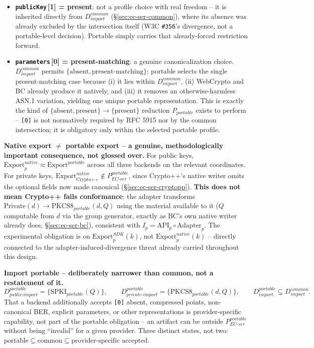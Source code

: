 \documentclass[11pt,a4paper]{article}
\begin{document}
\begin{itemize}
\item \textbf{\texttt{publicKey}\,[1] = present}: not a profile choice with real freedom -- it is inherited directly from $D_{import}^{common}$ (\S\ref{sec:ec-ser-common}), where its absence was already excluded by the intersection itself (W3C \texttt{\#356}'s divergence, not a portable-level decision). Portable simply carries that already-forced restriction forward.
\item \textbf{\texttt{parameters}\,[0] = present-matching}: a genuine canonicalization choice. $D_{import}^{common}$ permits $\{\text{absent}, \text{present-matching}\}$; portable selects the single present-matching case because (i) it lies within $D_{import}^{common}$, (ii) WebCrypto and BC already produce it natively, and (iii) it removes an otherwise-harmless ASN.1 variation, yielding one unique portable representation. This is exactly the kind of $\{\text{absent},\text{present}\} \to \{\text{present}\}$ reduction $P_{portable}$ exists to perform -- \texttt{[0]} is not normatively required by RFC 5915 nor by the common intersection; it is obligatory only within the selected portable profile.
\end{itemize}

\textbf{Native export $\neq$ portable export -- a genuine, methodologically important consequence, not glossed over.} For public keys, $\text{Export}_p^{native} \approx \text{Export}^{portable}$ across all three backends on the relevant coordinates. For private keys, $\text{Export}_{\text{Crypto++}}^{native} \notin P_{EC\text{-}ser}^{portable}$, since Crypto++'s native writer omits the optional fields now made canonical (\S\ref{sec:ec-ser-cryptopp}). \textbf{This does not mean Crypto++ fails conformance}: the adapter transforms $\text{Private}(d) \to \text{PKCS8}_{portable}(d,Q)$ using the material available to it ($Q$ computable from $d$ via the group generator, exactly as BC's own native writer already does, \S\ref{sec:ec-ser-bc}), consistent with $I_p = \text{API}_p \circ \text{Adapter}_p$. The experimental obligation is on $\text{Export}_p^{SDK}(k)$, not $\text{Export}_p^{native}(k)$ -- directly connected to the adapter-induced-divergence threat already carried throughout this design.

\textbf{Import portable -- deliberately narrower than common, not a restatement of it.}
\[
D_{public\text{-}import}^{portable} = \{\text{SPKI}_{portable}(Q)\}, \qquad D_{private\text{-}import}^{portable} = \{\text{PKCS8}_{portable}(d,Q)\}, \qquad D_{import}^{portable} \subsetneq D_{import}^{common}.
\]
That a backend additionally accepts \texttt{[0]} absent, compressed points, non-canonical BER, explicit parameters, or other representations is provider-specific capability, not part of the portable obligation -- an artifact can be outside $P_{EC\text{-}ser}^{portable}$ without being ``invalid'' for a given provider. Three distinct states, not two: $\text{portable} \subseteq \text{common} \subseteq \text{provider-specific accepted}$.
\end{document}
